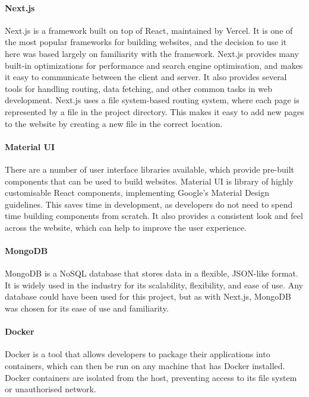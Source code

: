 \documentclass[../main.tex]{subfiles}
\begin{document}
        \paragraph*{Next.js}
            Next.js is a framework built on top of React, maintained by Vercel.
            It is one of the most popular frameworks for building websites, and the
                decision to use it here was based largely on familiarity with the framework.
            Next.js provides many built-in optimizations for performance and search engine
                optimisation, and makes it easy to communicate between the client and server.
            It also provides several tools for handling routing, data fetching, and other
                common tasks in web development.
            Next.js uses a file system-based routing system, where each page is represented
                by a file in the project directory.
            This makes it easy to add new pages to the website by creating a new file in
                the correct location.

        \paragraph*{Material UI}
            There are a number of user interface libraries available, which provide
                pre-built components that can be used to build websites.
            Material UI is library of highly customisable React components, implementing
                Google's Material Design guidelines.
            This saves time in development, as developers do not need to spend time
                building components from scratch.
            It also provides a consistent look and feel across the website, which can help
                to improve the user experience.

        \paragraph*{MongoDB}
            MongoDB is a NoSQL database that stores data in a flexible, JSON-like format.
            It is widely used in the industry for its scalability, flexibility, and ease of
                use.
            Any database could have been used for this project, but as with Next.js,
                MongoDB was chosen for its ease of use and familiarity.

        \paragraph*{Docker}
            Docker is a tool that allows developers to package their applications into
                containers, which can then be run on any machine that has Docker installed.
            Docker containers are isolated from the host, preventing access to its file
                system or unauthorised network.
\end{document}
